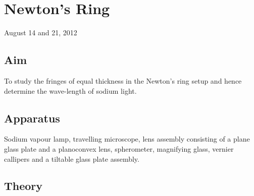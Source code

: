\chapter{Newton's Ring}
\begin{flushright}
August 14 and 21, 2012
\end{flushright}
\section{Aim}
	To study the fringes of equal thickness in the Newton's ring setup and hence determine the wave-length of sodium light.
\section{Apparatus}
	Sodium vapour lamp, travelling microscope, lens assembly consisting of a plane glass plate and a planoconvex lens, spherometer, magnifying glass, vernier callipers and a tiltable  glass plate assembly.

\section{Theory}
		
